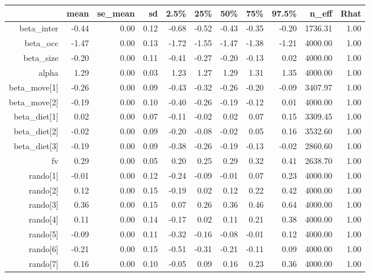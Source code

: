 \begin{table}[ht]
\centering
\begin{tabular}{rrrrrrrrrrr}
  \hline
 & mean & se\_mean & sd & 2.5\% & 25\% & 50\% & 75\% & 97.5\% & n\_eff & Rhat \\ 
  \hline
beta\_inter & -0.44 & 0.00 & 0.12 & -0.68 & -0.52 & -0.43 & -0.35 & -0.20 & 1736.31 & 1.00 \\ 
  beta\_occ & -1.47 & 0.00 & 0.13 & -1.72 & -1.55 & -1.47 & -1.38 & -1.21 & 4000.00 & 1.00 \\ 
  beta\_size & -0.20 & 0.00 & 0.11 & -0.41 & -0.27 & -0.20 & -0.13 & 0.02 & 4000.00 & 1.00 \\ 
  alpha & 1.29 & 0.00 & 0.03 & 1.23 & 1.27 & 1.29 & 1.31 & 1.35 & 4000.00 & 1.00 \\ 
  beta\_move[1] & -0.26 & 0.00 & 0.09 & -0.43 & -0.32 & -0.26 & -0.20 & -0.09 & 3407.97 & 1.00 \\ 
  beta\_move[2] & -0.19 & 0.00 & 0.10 & -0.40 & -0.26 & -0.19 & -0.12 & 0.01 & 4000.00 & 1.00 \\ 
  beta\_diet[1] & 0.02 & 0.00 & 0.07 & -0.11 & -0.02 & 0.02 & 0.07 & 0.15 & 3309.45 & 1.00 \\ 
  beta\_diet[2] & -0.02 & 0.00 & 0.09 & -0.20 & -0.08 & -0.02 & 0.05 & 0.16 & 3532.60 & 1.00 \\ 
  beta\_diet[3] & -0.19 & 0.00 & 0.09 & -0.38 & -0.26 & -0.19 & -0.13 & -0.02 & 2860.60 & 1.00 \\ 
  fv & 0.29 & 0.00 & 0.05 & 0.20 & 0.25 & 0.29 & 0.32 & 0.41 & 2638.70 & 1.00 \\ 
  rando[1] & -0.01 & 0.00 & 0.12 & -0.24 & -0.09 & -0.01 & 0.07 & 0.23 & 4000.00 & 1.00 \\ 
  rando[2] & 0.12 & 0.00 & 0.15 & -0.19 & 0.02 & 0.12 & 0.22 & 0.42 & 4000.00 & 1.00 \\ 
  rando[3] & 0.36 & 0.00 & 0.15 & 0.07 & 0.26 & 0.36 & 0.46 & 0.64 & 4000.00 & 1.00 \\ 
  rando[4] & 0.11 & 0.00 & 0.14 & -0.17 & 0.02 & 0.11 & 0.21 & 0.38 & 4000.00 & 1.00 \\ 
  rando[5] & -0.09 & 0.00 & 0.11 & -0.32 & -0.16 & -0.08 & -0.01 & 0.12 & 4000.00 & 1.00 \\ 
  rando[6] & -0.21 & 0.00 & 0.15 & -0.51 & -0.31 & -0.21 & -0.11 & 0.09 & 4000.00 & 1.00 \\ 
  rando[7] & 0.16 & 0.00 & 0.10 & -0.05 & 0.09 & 0.16 & 0.23 & 0.36 & 4000.00 & 1.00 \\ 

\end{tabular}
\end{table}
